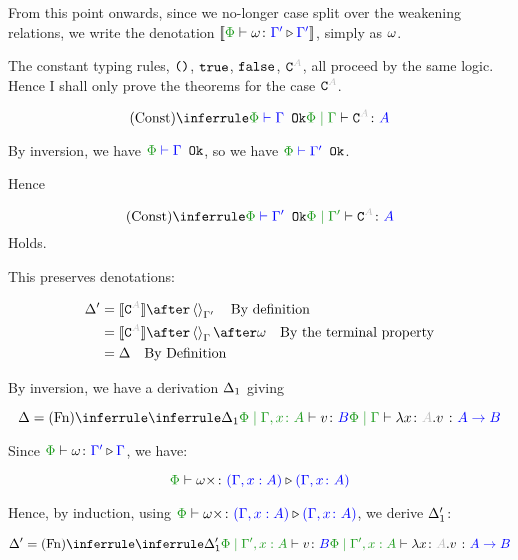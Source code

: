 {    From this point onwards, since we no-longer case split over the weakening relations, we write the denotation $\deno{\ewrel{\P}{\w}{\G'}{\G'}}$, simply as $\omega$.


    The constant typing rules, $\texttt{()}$, $\texttt{true}$, $\texttt{false}$, $\const{A}$, all proceed by the same logic. Hence I shall only prove the theorems for the case $\const{A}$.

    \begin{equation}
        \ntreeruleI{Const}{\wellformedok{\P}{\G}}{\gpetyperelation{\const{A}}{A}}
    \end{equation}

    By inversion, we have $\wellformedok{\P}{\G}$, so we have $\wellformedok{\P}{\G'}$.

    Hence

    \begin{equation}
        \ntreeruleI{Const}{\wellformedok{\P}{\G'}}{\etyperelation{\P}{\G'}{\const{A}}{A}}
    \end{equation}
    Holds.

    This preserves denotations:


    \begin{align}
        \D' & = \deno{\const{A}} \after \term{\G'}\qt{By definition}\\
        & = \deno{\const{A}} \after \term{\G}\after \w \qt{By the terminal property}\\
        & = \D\qt{By Definition}\\
    \end{align}


    By inversion, we have a derivation $\Delta_1$ giving

    \begin{equation}
        \D = \ntreeruleI{Fn}{
            \treeruleI{\D_1}{\etyperelation{\P}{\gax}{v}{B}}
        }{\gpetyperelation{\lam{x}{A}{v}}{\ab}}
    \end{equation}

    Since $\ewrel{\P}{\w}{\G'}{\G}$, we have:

    \begin{equation}
        \ewrel{\P}{\w\x}{(\G,x:  A)}{(\gax)}
    \end{equation}

    Hence, by induction, using $\ewrel{\P}{\w\x}{(\G,x:  A)}{(\gax)}$, we derive $\Delta_1'$:

    \begin{equation}
        \D' = \ntreeruleI{Fn}{
            \treeruleI{\D_1'}{\etyperelation{\P}{\G',x: A}{v}{B}}
        }{\etyperelation{\P}{\G',x: A}{\lam{x}{A}{v}}{\ab}}
    \end{equation}

}
